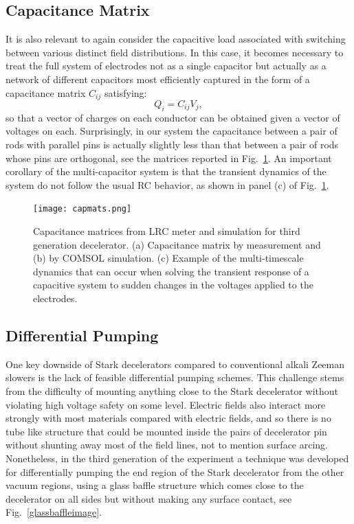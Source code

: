 \subsection{Capacitance Matrix\label{capmatsection}}

It is also relevant to again consider the capacitive load associated with switching between various distinct field distributions.
In this case, it becomes necessary to treat the full system of electrodes not as a single capacitor but actually as a network of different capacitors most efficiently captured in the form of a capacitance matrix $C_{ij}$ satisfying:
\begin{equation}
Q_i = C_{ij}V_j,
\end{equation}
so that a vector of charges on each conductor can be obtained given a vector of voltages on each.
Surprisingly, in our system the capacitance between a pair of rods with parallel pins is actually slightly less than that between a pair of rods whose pins are orthogonal, see the matrices reported in Fig.~\ref{capmat}.
An important corollary of the multi-capacitor system is that the transient dynamics of the system do not follow the usual RC behavior, as shown in panel (c) of Fig.~\ref{capmat}.

\begin{figure}[t!]
\centering
\texttt{[image: capmats.png]}
\caption[Capacitance Matrix for Third Generation Decelerator]{\label{capmat}
Capacitance matrices from LRC meter and simulation for third generation decelerator. (a) Capacitance matrix by measurement and (b) by COMSOL simulation. (c) Example of the multi-timescale dynamics that can occur when solving the transient response of a capacitive system to sudden changes in the voltages applied to the electrodes.
}
\end{figure}

\subsection{Differential Pumping}

One key downside of Stark decelerators compared to conventional alkali Zeeman slowers is the lack of feasible differential pumping schemes.
This challenge stems from the difficulty of mounting anything close to the Stark decelerator without violating high voltage safety on some level.
Electric fields also interact more strongly with most materials compared with electric fields, and so there is no tube like structure that could be mounted inside the pairs of decelerator pin without shunting away most of the field lines, not to mention surface arcing.
Nonetheless, in the third generation of the experiment a technique was developed for differentially pumping the end region of the Stark decelerator from the other vacuum regions, using a glass baffle structure which comes close to the decelerator on all sides but without making any surface contact, see Fig.~\ref{glassbaffleimage}.

